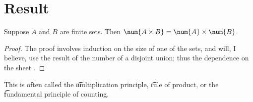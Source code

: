 
\blankpage
\section*{Result}

\begin{proposition}
Suppose $A$ and $B$ are finite sets.
Then $\num{A \times  B} = \num{A} \times  \num{B}$.
\end{proposition}

\begin{proof}The proof involves induction on the size of one of the sets, and will, I believe, use the result of the number of a disjoint union; thus the dependence on the sheet .\end{proof}
This is often called the \t{multiplication principle}, \t{rule of product}, or the \t{fundamental principle of counting}.

\blankpage